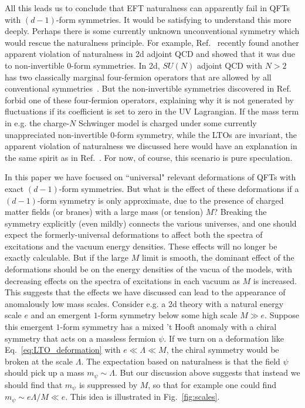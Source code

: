 \documentclass[11pt]{article}
\begin{document}
All this leads us to conclude that EFT naturalness can apparently fail in QFTs with $(d-1)$-form symmetries.  
It would be  satisfying to understand this more deeply. Perhaps there is some currently unknown unconventional 
symmetry which would rescue the naturalness principle.  For example, Ref.~\cite{Komargodski:2020mxz} recently 
found another apparent violation of naturalness in 2d adjoint QCD   and showed that it was due to non-invertible 
$0$-form symmetries.  
In 2d, $SU(N)$ adjoint QCD with $N>2$ has two classically marginal four-fermion operators that are allowed by all conventional symmetries~\cite{Cherman:2019hbq}.  But the non-invertible symmetries discovered  in Ref.~\cite{Komargodski:2020mxz} 
forbid one of these four-fermion operators, explaining why it is not generated by fluctuations if its 
coefficient is set to zero in the UV Lagrangian.  If the mass term in e.g. the charge-$N$ Schwinger model is 
charged under some currently unappreciated non-invertible $0$-form symmetry, while the LTOs are invariant, 
the apparent violation of naturalness we discussed here would have an explanation in the same spirit 
as in Ref.~\cite{Komargodski:2020mxz}.  For now, of course, this scenario is pure speculation. 


In this paper we have focused on ``universal" relevant deformations of QFTs with 
exact $(d-1)$-form symmetries. But what is the effect of these deformations if a $(d-1)$-form 
symmetry is only approximate, due to the presence of charged matter fields (or branes)
with a large mass (or tension) $M$?  Breaking the symmetry explicitly (even mildly) 
connects the various universes, 
and one should expect the formerly-universal deformations to affect both the spectra of 
excitations and the vacuum energy densities.  These effects will no longer be exactly calculable. 
But if the large $M$ limit is smooth, the dominant effect of the deformations should be 
on the energy densities of the vacua of the models, with decreasing effects on the 
spectra of excitations in each vacuum as $M$ is increased.   This suggests that the effects we have discussed can lead to the appearance of anomalously low mass scales. Consider e.g. a 2d theory with a natural energy scale $e$ and an emergent $1$-form symmetry below some high scale $M \gg e$. Suppose this emergent $1$-form symmetry has a mixed 't Hooft anomaly with a chiral symmetry that acts on a massless fermion $\psi$.  If we turn on a deformation like Eq.~\eqref{eq:LTO_deformation} with $e \ll \Lambda \ll M$, the chiral symmetry would be broken at the scale $\Lambda$.  The expectation based on naturalness is that the field $\psi$ should pick up a mass $m_{\psi} \sim \Lambda$.  But our discussion above suggests that instead we should  find that $m_{\psi}$ is suppressed by $M$, so that for example one could find $m_{\psi} \sim e \Lambda/M \ll e$.  This idea is illustrated in Fig.~\ref{fig:scales}. 
\end{document}
